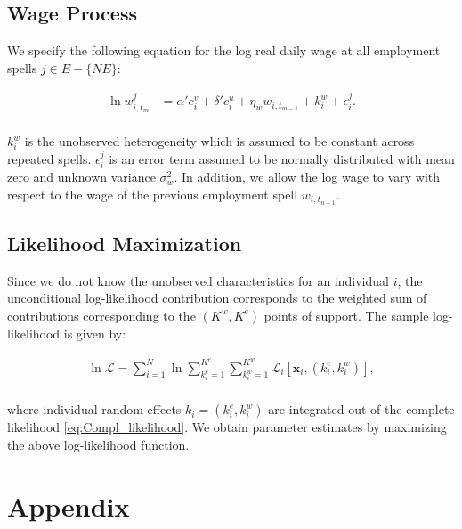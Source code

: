 \documentclass[12pt, a4paper]{article}
\renewcommand{\thefigure}{\Roman{figure}}
\begin{document}
\subsection{Wage Process}\label{sec:income_process}

We specify the following equation for the log real daily wage at all employment spells $j \in E - \{NE\}$:

\begin{align}
\ln w_{i,t_m}^{j} & = \alpha' c_i^{v} + \delta' c_i^u + \eta_{w}w_{i,t_{m-1}} + k_i^w + \epsilon_{i}^{j} .\\ \nonumber
\end{align}

$k_i^{w}$ is the unobserved heterogeneity which is assumed to be constant across repeated spells. $\epsilon_i^j$ is an error term assumed to be normally distributed with mean zero and unknown variance $\sigma_{w}^{2}$. In addition, we allow the log wage to vary with respect to the wage of the previous employment spell $w_{i,t_{n-1}}$.

\subsection{Likelihood Maximization}\label{sec:maximization}

Since we do not know the unobserved characteristics for an individual $i$, the unconditional log-likelihood contribution corresponds to the weighted sum of contributions corresponding to the $(K^{w},K^{e})$ points of support. The sample log-likelihood is given by:

\begin{align}\label{eq:Compl_likelihood}
\ln \mathcal{L} = \sum_{i=1}^{N} \ln \sum_{k_i^e=1}^{K^e} \sum_{k_i^w=1}^{K^w} \mathcal{L}_{i}[\textbf{x}_i, (k_i^{e},k_i^{w})], 	\\ \nonumber
\end{align}

where individual random effects $k_i = (k_i^e,k_i^w)$ are integrated out of the complete likelihood \ref{eq:Compl_likelihood}. We obtain parameter estimates by maximizing the above log-likelihood function.




\newpage
{}

%
 

\newpage
\setcounter{section}{0}
\renewcommand{\thesection}{\Alph{section}} 
\renewcommand{\thesubsection}{\thesection.\arabic{subsection}}
\section{Appendix\label{Sec: Preliminary}}
\setcounter{table}{0}
\renewcommand{\thetable}{A\arabic{table}}
\setcounter{figure}{0}
\renewcommand{\thefigure}{A\arabic{figure}}
\end{document}
